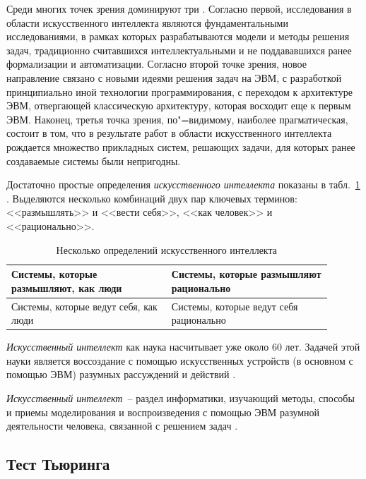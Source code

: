 \documentclass[a4paper,14pt, openany, twoside, final]{extbook} %
\begin{document}
Среди многих точек зрения доминируют три \cite{AIDictionary}. Согласно первой, исследования в области искусственного интеллекта являются фундаментальными исследованиями, в рамках которых разрабатываются модели и методы решения задач, традиционно считавшихся интеллектуальными и не поддававшихся ранее формализации и автоматизации. Согласно второй точке зрения, новое направление связано с новыми идеями решения задач на ЭВМ, с разработкой принципиально иной технологии программирования, с переходом к архитектуре ЭВМ, отвергающей классическую архитектуру, которая восходит еще к первым ЭВМ. Наконец, третья точка зрения, по"=видимому, наиболее прагматическая, состоит в том, что в результате работ в области искусственного интеллекта рождается множество прикладных систем, решающих задачи, для которых ранее создаваемые системы были непригодны.

Достаточно простые определения {\em искусственного интеллекта} показаны в табл.~\ref{pic:determai} \cite{Russell}. Выделяются несколько комбинаций двух пар ключевых терминов: <<размышлять>> и <<вести себя>>, <<как человек>> и <<рационально>>.

\begin{table}[h]
\begin{center}
\caption{Несколько определений искусственного интеллекта} \label{pic:determai}%
\begin{tabular}{|p{0.45\linewidth}|p{0.45\linewidth}|}
 \hline
   Системы, которые размышляют, как люди
 &
   Системы, которые размышляют рационально
 \\ \hline
   Системы, которые ведут себя, как люди
 &
   Системы, которые ведут себя рационально
 \\  \hline
\end{tabular}
\end{center}
\end{table}

{\em Искусственный интеллект} как наука насчитывает уже около 60 лет. Задачей этой науки является воссоздание с помощью искусственных устройств (в основном с помощью ЭВМ) разумных рассуждений и действий \cite{Lauriere}.

{\em Искусственный интеллект}~-- раздел информатики, изучающий методы, способы и приемы моделирования и воспроизведения с помощью ЭВМ разумной деятельности человека, связанной с решением задач \cite{math_slov:88}.

\subsection{Тест Тьюринга}
\end{document}
